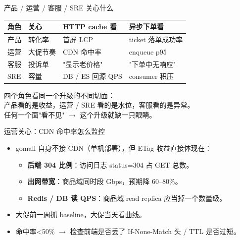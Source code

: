 \begin{frame}{产品 / 运营 / 客服 / SRE 关心什么}
\begin{tabular}{@{}llll@{}}
\toprule
角色 & 关心 & HTTP cache 看 & 异步下单看 \\
\midrule
产品 & 转化率   & 首屏 LCP        & ticket 落单成功率 \\
运营 & 大促节奏 & CDN 命中率      & enqueue p95 \\
客服 & 投诉单   & "显示老价格"    & "下单中无响应" \\
SRE & 容量    & DB / ES 回源 QPS & consumer 积压 \\
\bottomrule
\end{tabular}
\vspace{3mm}
\small 四个角色看同一个升级的不同切面：\\
产品看的是收益，运营 / SRE 看的是水位，客服看的是异常。\\
任何一个面"看不见" $\to$ 这个升级就缺一只眼睛。
\end{frame}

\begin{frame}{运营关心：CDN 命中率怎么监控}
\begin{itemize}
  \item gomall 自身不接 CDN（单机部署），但 ETag 收益直接体现在：
  \begin{itemize}
    \item \textbf{后端 304 比例}：访问日志 status=304 占 GET 总数。
    \item \textbf{出网带宽}：商品域同时段 Gbps，预期降 60--80\%。
    \item \textbf{Redis / DB 读 QPS}：商品域 read replica 应当掉一个数量级。
  \end{itemize}
  \item 大促前一周抓 baseline，大促当天看曲线。
  \item 命中率<50\% $\to$ 检查前端是否丢了 If-None-Match 头 / TTL 是否过短。
\end{itemize}
\end{frame}

